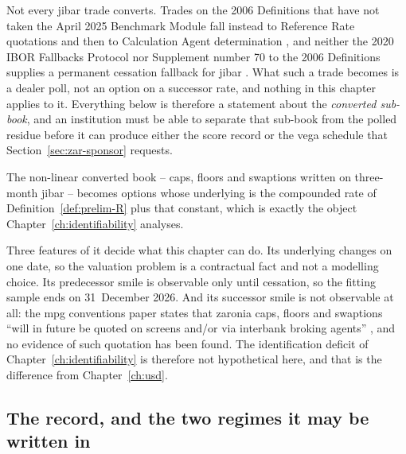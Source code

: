 \documentclass[../../../main.tex]{subfiles}
\begin{document}
Not every \gls{jibar} trade converts. Trades on the 2006 Definitions that have not taken the April 2025 Benchmark Module fall instead to Reference Rate quotations and then to Calculation Agent determination \citep[Sect.~5]{isda2025}, and neither the 2020 IBOR Fallbacks Protocol nor Supplement number 70 to the 2006 Definitions supplies a permanent cessation fallback for \gls{jibar} \citep[Sect.~8]{isda2025}. What such a trade becomes is a dealer poll, not an option on a successor rate, and nothing in this chapter applies to it. Everything below is therefore a statement about the \emph{converted sub-book}, and an institution must be able to separate that sub-book from the polled residue before it can produce either the score record or the vega schedule that Section~\ref{sec:zar-sponsor} requests.

The non-linear converted book -- caps, floors and swaptions written on three-month \gls{jibar} -- becomes options whose underlying is the compounded rate of Definition~\ref{def:prelim-R} plus that constant, which is exactly the object Chapter~\ref{ch:identifiability} analyses.

Three features of it decide what this chapter can do. Its underlying changes on one date, so the valuation problem is a contractual fact and not a modelling choice. Its predecessor smile is observable only until cessation, so the fitting sample ends on 31~December 2026. And its successor smile is not observable at all: the \gls{mpg} conventions paper states that \gls{zaronia} caps, floors and swaptions ``will in future be quoted on screens and/or via interbank broking agents'' \citep[\S3, p.~5]{sarb2024conv}, and no evidence of such quotation has been found. The identification deficit of Chapter~\ref{ch:identifiability} is therefore not hypothetical here, and that is the difference from Chapter~\ref{ch:usd}.


\subsection{The record, and the two regimes it may be written in}
\end{document}
